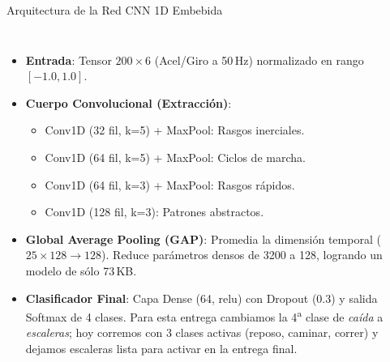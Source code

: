 \documentclass[aspectratio=169, 10pt]{beamer}
\begin{document}
\begin{frame}{Arquitectura de la Red CNN 1D Embebida}
    \begin{columns}[T]
        \scriptsize
        \begin{itemize}\itemsep0.08cm
            \item \textbf{Entrada}: Tensor $200 \times 6$ (Acel/Giro a 50\,Hz) normalizado en rango $[-1.0, 1.0]$.
            \item \textbf{Cuerpo Convolucional (Extracción)}:
                \begin{itemize}\itemsep0.02cm
                    \item Conv1D (32 fil, k=5) + MaxPool: Rasgos inerciales.
                    \item Conv1D (64 fil, k=5) + MaxPool: Ciclos de marcha.
                    \item Conv1D (64 fil, k=3) + MaxPool: Rasgos rápidos.
                    \item Conv1D (128 fil, k=3): Patrones abstractos.
                \end{itemize}
            \item \textbf{Global Average Pooling (GAP)}: Promedia la dimensión temporal ($25 \times 128 \rightarrow 128$). Reduce parámetros densos de 3200 a 128, logrando un modelo de sólo 73\,KB.
            \item \textbf{Clasificador Final}: Capa Dense (64, relu) con Dropout (0.3) y salida Softmax de 4 clases. Para esta entrega cambiamos la 4\textsuperscript{a} clase de \emph{ca\'ida} a \emph{escaleras}; hoy corremos con \alert{3 clases activas} (reposo, caminar, correr) y dejamos escaleras lista para activar en la entrega final.
        \end{itemize}
        
        \centering
\end{columns}
\end{frame}
\end{document}
